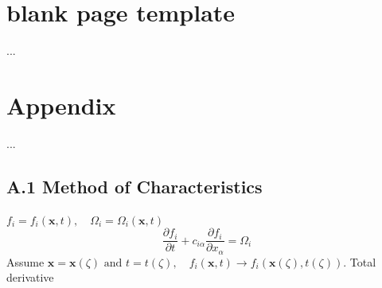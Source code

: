 \documentclass[draft]{article}
\begin{document}
\section*{blank page template}
...
\clearpage

\appendix
\section*{Appendix}
...
\clearpage










\subsection*{A.1 Method of Characteristics}
\renewcommand{\theequation}{A.1.\arabic{equation}}
\setcounter{equation}{0}

$f_i = f_i(\bm{x}, t), \quad \Omega_i = \Omega_i(\bm{x}, t)$ 
\begin{equation}
	\frac{\partial f_i}{\partial t} + c_{i \alpha} \frac{\partial f_i}{\partial x_\alpha} = \Omega_i \label{A.1.1}
\end{equation}
Assume $\bm{x} = \bm{x}(\zeta) \text{ and } t = t(\zeta), \quad f_i(\bm{x}, t) \rightarrow f_i(\bm{x}(\zeta), t(\zeta))$. Total derivative
\end{document}
